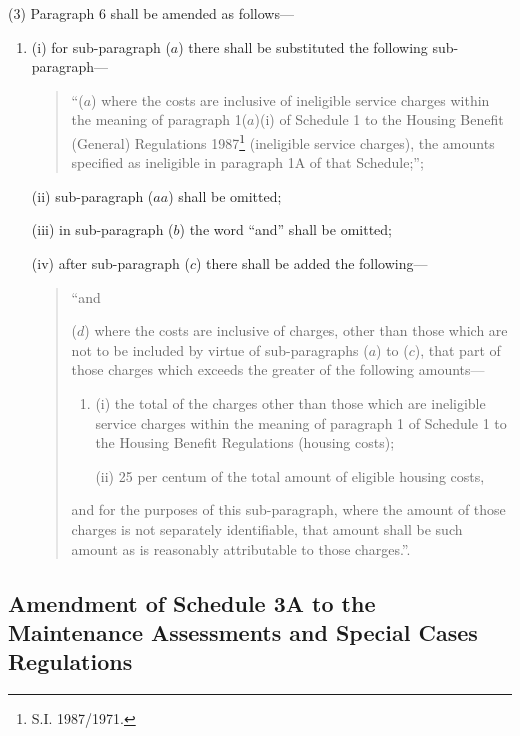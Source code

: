 \documentclass[a4paper]{article}
\begin{document}
(3) Paragraph 6 shall be amended as follows—
\begin{enumerate}\item[]
(i) for sub-paragraph ($a$) there shall be substituted the following sub-paragraph—
\begin{quotation}
\begin{sloppypar}
“($a$) where the costs are inclusive of ineligible service charges within the meaning of paragraph 1($a$)(i) of Schedule 1 to the Housing Benefit (General) Regulations 1987\footnote{\frenchspacing S.I. 1987/1971.} (ineligible service charges), the amounts specified as ineligible in paragraph 1A of that Schedule;”;
\end{sloppypar}
\end{quotation}

(ii) sub-paragraph ($aa$) shall be omitted;

(iii) in sub-paragraph ($b$) the word “and” shall be omitted;

(iv) after sub-paragraph ($c$) there shall be added the following—
\begin{quotation}
“and

($d$) where the costs are inclusive of charges, other than those which are not to be included by virtue of sub-paragraphs ($a$) to ($c$), that part of those charges which exceeds the greater of the following amounts—
\begin{enumerate}\item[]
(i) the total of the charges other than those which are ineligible service charges within the meaning of paragraph 1 of Schedule 1 to the Housing Benefit Regulations (housing costs);

(ii) 25 per centum of the total amount of eligible housing costs,
\end{enumerate}
and for the purposes of this sub-paragraph, where the amount of those charges is not separately identifiable, that amount shall be such amount as is reasonably attributable to those charges.”.
\end{quotation}

\end{enumerate}

\subsection[48. Amendment of Schedule 3A to the Maintenance Assessments and Special Cases Regulations]{Amendment of Schedule 3A to the Maintenance Assessments and Special Cases Regulations}
\end{document}

